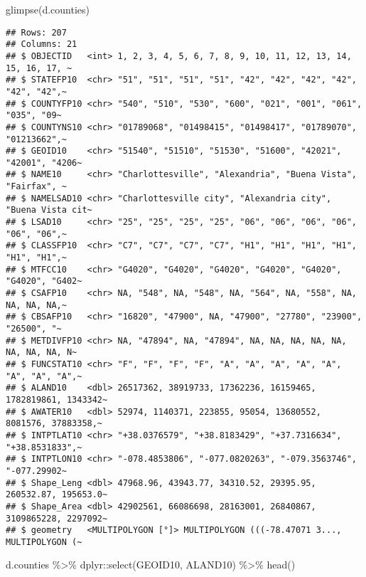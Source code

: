 \documentclass[
]{article}
\newenvironment{Shaded}{\begin{snugshade}}{\end{snugshade}}
\newcommand{\FunctionTok}[1]{\textcolor[rgb]{0.00,0.00,0.00}{#1}}
\newcommand{\NormalTok}[1]{#1}
\newcommand{\SpecialCharTok}[1]{\textcolor[rgb]{0.00,0.00,0.00}{#1}}
\begin{document}
\begin{Shaded}
\begin{Highlighting}[]
\FunctionTok{glimpse}\NormalTok{(d.counties)}
\end{Highlighting}
\end{Shaded}

\begin{verbatim}
## Rows: 207
## Columns: 21
## $ OBJECTID   <int> 1, 2, 3, 4, 5, 6, 7, 8, 9, 10, 11, 12, 13, 14, 15, 16, 17, ~
## $ STATEFP10  <chr> "51", "51", "51", "51", "42", "42", "42", "42", "42", "42",~
## $ COUNTYFP10 <chr> "540", "510", "530", "600", "021", "001", "061", "035", "09~
## $ COUNTYNS10 <chr> "01789068", "01498415", "01498417", "01789070", "01213662",~
## $ GEOID10    <chr> "51540", "51510", "51530", "51600", "42021", "42001", "4206~
## $ NAME10     <chr> "Charlottesville", "Alexandria", "Buena Vista", "Fairfax", ~
## $ NAMELSAD10 <chr> "Charlottesville city", "Alexandria city", "Buena Vista cit~
## $ LSAD10     <chr> "25", "25", "25", "25", "06", "06", "06", "06", "06", "06",~
## $ CLASSFP10  <chr> "C7", "C7", "C7", "C7", "H1", "H1", "H1", "H1", "H1", "H1",~
## $ MTFCC10    <chr> "G4020", "G4020", "G4020", "G4020", "G4020", "G4020", "G402~
## $ CSAFP10    <chr> NA, "548", NA, "548", NA, "564", NA, "558", NA, NA, NA, NA,~
## $ CBSAFP10   <chr> "16820", "47900", NA, "47900", "27780", "23900", "26500", "~
## $ METDIVFP10 <chr> NA, "47894", NA, "47894", NA, NA, NA, NA, NA, NA, NA, NA, N~
## $ FUNCSTAT10 <chr> "F", "F", "F", "F", "A", "A", "A", "A", "A", "A", "A", "A",~
## $ ALAND10    <dbl> 26517362, 38919733, 17362236, 16159465, 1782819861, 1343342~
## $ AWATER10   <dbl> 52974, 1140371, 223855, 95054, 13680552, 8081576, 37883358,~
## $ INTPTLAT10 <chr> "+38.0376579", "+38.8183429", "+37.7316634", "+38.8531833",~
## $ INTPTLON10 <chr> "-078.4853806", "-077.0820263", "-079.3563746", "-077.29902~
## $ Shape_Leng <dbl> 47968.96, 43943.77, 34310.52, 29395.95, 260532.87, 195653.0~
## $ Shape_Area <dbl> 42902561, 66086698, 28163001, 26840867, 3109865228, 2297092~
## $ geometry   <MULTIPOLYGON [°]> MULTIPOLYGON (((-78.47071 3..., MULTIPOLYGON (~
\end{verbatim}

\begin{Shaded}
\begin{Highlighting}[]
\NormalTok{d.counties }\SpecialCharTok{\%\textgreater{}\%}\NormalTok{ dplyr}\SpecialCharTok{::}\FunctionTok{select}\NormalTok{(GEOID10, ALAND10) }\SpecialCharTok{\%\textgreater{}\%} \FunctionTok{head}\NormalTok{()}
\end{Highlighting}
\end{Shaded}
\end{document}

